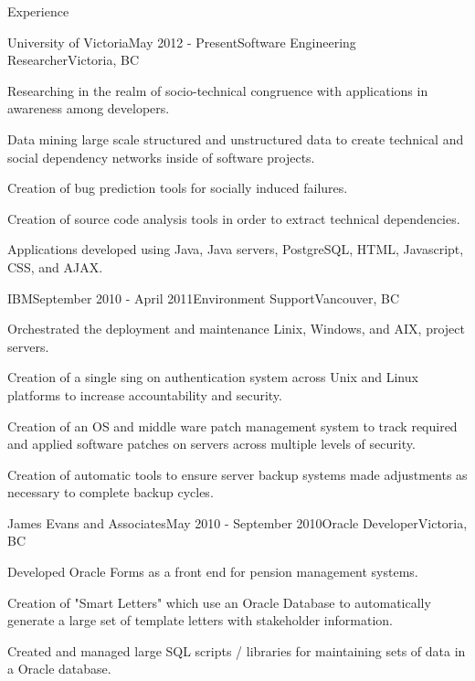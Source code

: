 \documentclass{resume} %
\begin{document}
\begin{rSection}{Experience}

\begin{rSubsection}{University of Victoria}{May 2012 - Present}{Software Engineering Researcher}{Victoria, BC}
\item Researching in the realm of socio-technical congruence with applications in awareness among developers.
\item Data mining large scale structured and unstructured data to create technical and social dependency networks
inside of software projects.
\item Creation of bug prediction tools for socially induced failures.
\item Creation of source code analysis tools in order to extract technical dependencies.
\item Applications developed using Java, Java servers, PostgreSQL, HTML, Javascript, CSS, and AJAX.
\end{rSubsection}


\begin{rSubsection}{IBM}{September 2010 - April 2011}{Environment Support}{Vancouver, BC}
\item Orchestrated the deployment and maintenance Linix, Windows, and AIX, project servers.
\item Creation of a single sing on authentication system across Unix and Linux platforms to increase accountability and security.
\item Creation of an OS and middle ware patch management system to track required and applied software patches on servers across multiple levels of security.
\item Creation of automatic tools to ensure server backup systems made adjustments as necessary to complete backup cycles.
\end{rSubsection}


\begin{rSubsection}{James Evans and Associates}{May 2010 - September 2010}{Oracle Developer}{Victoria, BC}
\item Developed Oracle Forms as a front end for pension management systems.
\item Creation of "Smart Letters" which use an Oracle Database to automatically generate a large set of template letters with stakeholder information.
\item Created and managed large SQL scripts / libraries for maintaining sets of data in a Oracle database.
\end{rSubsection}

\end{rSection}
\end{document}
